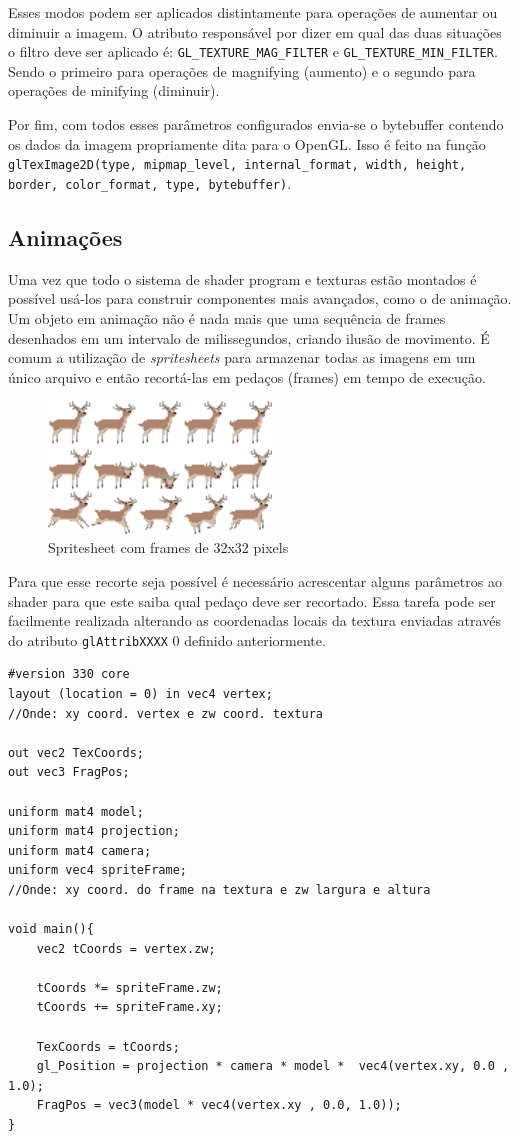 \documentclass[12pt, 
openright, 
oneside, 
a4paper,    
brazil]{facom-ufu-abntex2}
\begin{document}
Esses modos podem ser aplicados distintamente para operações de aumentar ou diminuir a imagem. O atributo responsável por dizer em qual das duas situações o filtro deve ser aplicado é: \texttt{GL_TEXTURE_MAG_FILTER} e \texttt{GL_TEXTURE_MIN_FILTER}. Sendo o primeiro para operações de magnifying (aumento) e o segundo para operações de minifying (diminuir).

Por fim, com todos esses parâmetros configurados envia-se o bytebuffer contendo os dados da imagem propriamente dita para o OpenGL. Isso é feito na função \texttt{glTexImage2D(type, mipmap_level, internal_format, width, height, border, color_format, type, bytebuffer)}.

\subsection{Animações}
Uma vez que todo o sistema de shader program e texturas estão montados é possível usá-los para construir componentes mais avançados, como o de animação. Um objeto em animação não é nada mais que uma sequência de frames desenhados em um intervalo de milissegundos, criando ilusão de movimento. É comum a utilização de \textit{spritesheets} para armazenar todas as imagens em um único arquivo e então recortá-las em pedaços (frames) em tempo de execução.

\begin{figure}[H]
	\centering
	\includegraphics[width=16em]{imagens/spritesheet.png}
	\caption{Spritesheet com frames de 32x32 pixels}
\end{figure}
Para que esse recorte seja possível é necessário acrescentar alguns parâmetros ao shader para que este saiba qual pedaço deve ser recortado. Essa tarefa pode ser facilmente realizada alterando as coordenadas locais da textura enviadas através do atributo \texttt{glAttribXXXX} 0 definido anteriormente.


\begin{lstlisting}[caption=Vertex shader com animações]
#version 330 core
layout (location = 0) in vec4 vertex;
//Onde: xy coord. vertex e zw coord. textura
 
out vec2 TexCoords;
out vec3 FragPos;

uniform mat4 model;
uniform mat4 projection;
uniform mat4 camera;
uniform vec4 spriteFrame;
//Onde: xy coord. do frame na textura e zw largura e altura

void main(){
	vec2 tCoords = vertex.zw;

	tCoords *= spriteFrame.zw;
	tCoords += spriteFrame.xy;

	TexCoords = tCoords;
	gl_Position = projection * camera * model *  vec4(vertex.xy, 0.0 , 1.0);
	FragPos = vec3(model * vec4(vertex.xy , 0.0, 1.0));
}

\end{lstlisting}
\end{document}
